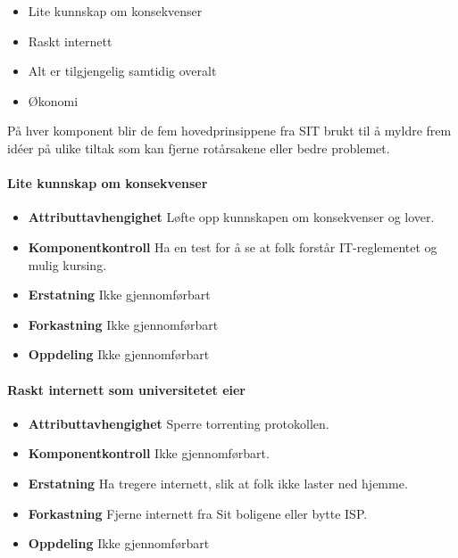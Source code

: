 \begin{itemize}
    \item Lite kunnskap om konsekvenser
    \item Raskt internett
    \item Alt er tilgjengelig samtidig overalt
    \item Økonomi
\end{itemize}

På hver komponent blir de fem hovedprinsippene fra SIT brukt til å myldre frem idéer på ulike tiltak som kan fjerne rotårsakene eller bedre problemet.

\paragraph{Lite kunnskap om konsekvenser}
\begin{itemize}
    \item \textbf{Attributtavhengighet} Løfte opp kunnskapen om konsekvenser og lover.
    \item \textbf{Komponentkontroll} Ha en test for å se at folk forstår IT-reglementet og mulig kursing.
    \item \textbf{Erstatning} Ikke gjennomførbart
    \item \textbf{Forkastning} Ikke gjennomførbart
    \item \textbf{Oppdeling} Ikke gjennomførbart
\end{itemize}

\paragraph{Raskt internett som universitetet eier}
\begin{itemize}
    \item \textbf{Attributtavhengighet} Sperre torrenting protokollen.
    \item \textbf{Komponentkontroll} Ikke gjennomførbart.
    \item \textbf{Erstatning} Ha tregere internett, slik at folk ikke laster ned hjemme.
    \item \textbf{Forkastning} Fjerne internett fra Sit boligene eller bytte ISP.
    \item \textbf{Oppdeling} Ikke gjennomførbart
\end{itemize}

